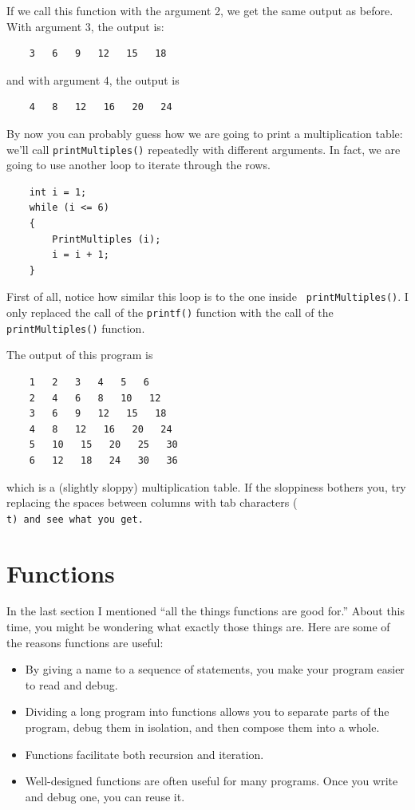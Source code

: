 If we call this function with the argument 2, we get the same
output as before.  With argument 3, the output is:

\begin{verbatim}
    3   6   9   12   15   18
\end{verbatim}
%
and with argument 4, the output is

\begin{verbatim}
    4   8   12   16   20   24 
\end{verbatim}
%
By now you can probably guess how we are going to print a
multiplication table: we'll call {\tt printMultiples()} repeatedly with
different arguments.  In fact, we are going to use another loop to
iterate through the rows.

\begin{verbatim}
    int i = 1;
    while (i <= 6) 
    {
        PrintMultiples (i);
        i = i + 1;
    }    
\end{verbatim}
%
First of all, notice how similar this loop is to the one inside {\tt
printMultiples()}.  I only replaced the call of the \texttt{printf()} function with 
the call of the \texttt{printMultiples()} function.

The output of this program is

\begin{verbatim}
    1   2   3   4   5   6   
    2   4   6   8   10   12   
    3   6   9   12   15   18   
    4   8   12   16   20   24   
    5   10   15   20   25   30   
    6   12   18   24   30   36   
\end{verbatim}
%
which is a (slightly sloppy) multiplication table.  If the
sloppiness bothers you, try replacing the spaces between
columns with tab characters (\tt \\t) and see what you get.

\section{Functions}

In the last section I mentioned ``all the things functions
are good for.''  About this time, you might be wondering
what exactly those things are.  Here are some of the reasons
functions are useful:

\begin{itemize}

\item By giving a name to a sequence of statements, you make
your program easier to read and debug.

\item Dividing a long program into functions allows you to
separate parts of the program, debug them in isolation, and
then compose them into a whole.

\item Functions facilitate both recursion and iteration.

\item Well-designed functions are often useful for many programs.
Once you write and debug one, you can reuse it.

\end{itemize}

